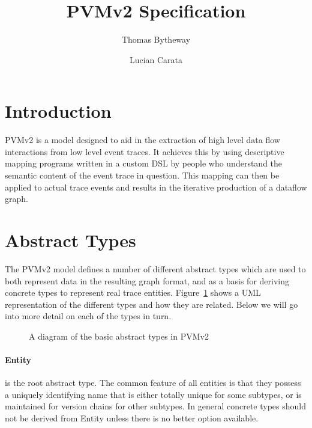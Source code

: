 \documentclass[12pt,twoside,a4paper]{article}
\begin{document}
\title{PVMv2 Specification}
\author{Thomas Bytheway \and Lucian Carata}

\maketitle

\clearpage

\section{Introduction}
PVMv2 is a model designed to aid in the extraction of high level data flow interactions from low level event traces. It achieves this by using descriptive mapping programs written in a custom DSL by people who understand the semantic content of the event trace in question. This mapping can then be applied to actual trace events and results in the iterative production of a dataflow graph.

\section{Abstract Types}
\label{sec:ty}
The PVMv2 model defines a number of different abstract types which are used to both represent data in the resulting graph format, and as a basis for deriving concrete types to represent real trace entities. Figure~\ref{fig:types} shows a UML representation of the different types and how they are related. Below we will go into more detail on each of the types in turn.

\begin{figure}[h]
\centering
{}
\caption{A diagram of the basic abstract types in PVMv2}
\label{fig:types}
\end{figure}

\paragraph{Entity}
\label{sec:ty:entity}
 is the root abstract type. The common feature of all entities is that they possess a uniquely identifying name that is either totally unique for some subtypes, or is maintained for version chains for other subtypes. In general concrete types should not be derived from Entity unless there is no better option available.
\end{document}
